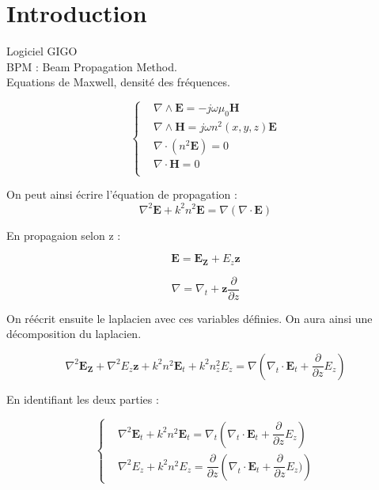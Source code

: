 \documentclass[a4paper,11pt]{report}
\title{}
\author{}
\begin{document}
\maketitle
\tableofcontents

\chapter{Introduction}

Logiciel GIGO\\
BPM : Beam Propagation Method.\\

Equations de Maxwell, densité des fréquences.

\begin{equation}
    \left\{
    \begin{aligned}
        &\nabla\wedge \mathbf{E}=-j\omega\mu_0\mathbf{H}\\        
        &\nabla\wedge \mathbf{H}=j\omega n^2(x,y,z)\mathbf{E}\\
        &\nabla\cdot(n^2\mathbf{E})=0\\
        &\nabla\cdot\mathbf{H}=0\\
    \end{aligned}
    \right.
\end{equation}

On peut ainsi écrire l'équation de propagation :
\begin{equation}
    \nabla^2\mathbf{E}+k^2n^2\mathbf{E}=\nabla(\nabla\cdot\mathbf{E})
\end{equation}

En propagaion selon z :

\[\mathbf{E}=\mathbf{E_Z}+E_z\mathbf{z}\]

\[\nabla=\nabla_t+\mathbf{z}\dfrac{\partial }{\partial z}\]

On réécrit ensuite le laplacien avec ces variables définies. On aura ainsi une décomposition du laplacien.

\begin{equation}
    \nabla^2\mathbf{E_Z}+\nabla^2E_z\mathbf{z}+k^2n^2\mathbf{E}_t+k^2n^2_zE_z=\nabla(\nabla_t\cdot\mathbf{E}_t+\dfrac{\partial}{\partial z}E_z)
\end{equation}

En identifiant les deux parties :

 \begin{equation}
     \left\{     
     \begin{aligned}
         &\nabla^2\mathbf{E}_t+k^2n^2\mathbf{E}_t=\nabla_t(\nabla_t\cdot\mathbf{E}_t+\dfrac{\partial}{\partial z}E_z)\\
         &\nabla^2 E_z+k^2 n^2 E_z=\dfrac{\partial }{\partial z}\left(\nabla_t\cdot\mathbf{E}_t+\dfrac{\partial}{\partial z}E_z)\right)
     \end{aligned}
     \right.
 \end{equation}
\end{document}
